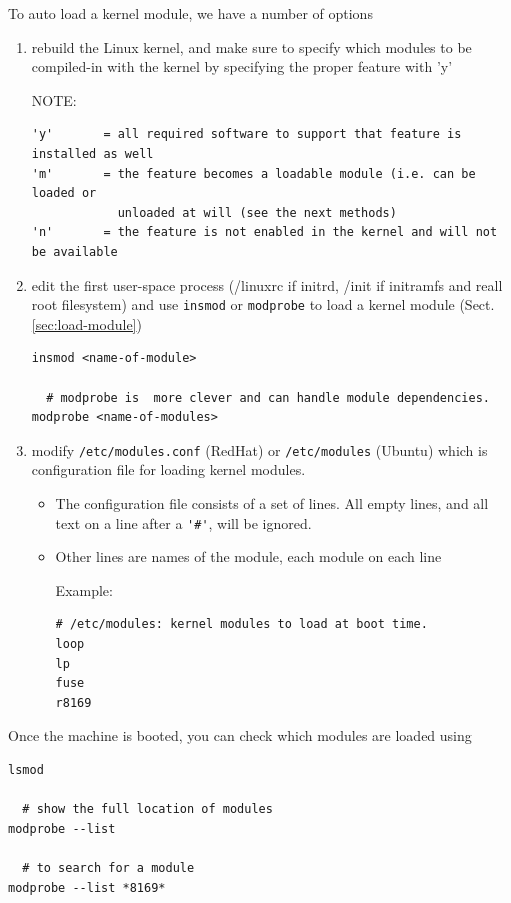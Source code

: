 To auto load a kernel module, we have a number of options
\begin{enumerate}
  \item rebuild the Linux kernel, and make sure to specify which modules to be
  compiled-in with the kernel by specifying the proper feature with 'y'
  
 NOTE:
 \begin{verbatim}
'y'       = all required software to support that feature is installed as well
'm'       = the feature becomes a loadable module (i.e. can be loaded or
            unloaded at will (see the next methods)
'n'       = the feature is not enabled in the kernel and will not be available            
 \end{verbatim}
  
  
  \item edit the first user-space process (/linuxrc if initrd, /init if
  initramfs and reall root filesystem) and use \verb!insmod!  or \verb!modprobe!
  to load a kernel module  (Sect.\ref{sec:load-module}) 
\begin{verbatim}
insmod <name-of-module>

  # modprobe is  more clever and can handle module dependencies.
modprobe <name-of-modules> 
\end{verbatim}
  
  \item modify
\verb!/etc/modules.conf! (RedHat) or \verb!/etc/modules! (Ubuntu)
which is
configuration file for loading kernel modules.
\begin{itemize}
  \item  The configuration file consists of a set of lines. All empty lines, and
  all text on a line after a \verb!'#'!, will be ignored.
  
  \item Other lines are names of the module, each module on each line
  
Example:  
\begin{verbatim}
# /etc/modules: kernel modules to load at boot time.
loop
lp
fuse
r8169
\end{verbatim} 
\end{itemize}


\end{enumerate}

Once the machine is booted, you can check 
which modules are loaded using
\begin{verbatim}
lsmod

  # show the full location of modules
modprobe --list

  # to search for a module
modprobe --list *8169*    
\end{verbatim}

